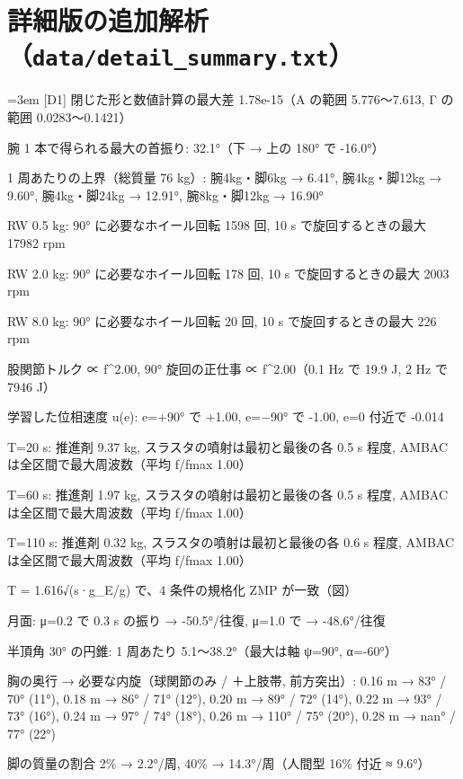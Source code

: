 \section{詳細版の追加解析（\texttt{data/detail\_summary.txt}）}
{\footnotesize\raggedright\sloppy\setlength{\parindent}{0pt}\setlength{\parskip}{0pt}\emergencystretch=3em
[D1] 閉じた形と数値計算の最大差 1.78e-15（A の範囲 5.776〜7.613, Γ の範囲 0.0283〜0.1421）\par
[D2] 腕 1 本で得られる最大の首振り: 32.1°（下 → 上の 180° で -16.0°）\par
[D3] 1 周あたりの上界（総質量 76 kg）: 腕4kg・脚6kg → 6.41°, 腕4kg・脚12kg → 9.60°, 腕4kg・脚24kg → 12.91°, 腕8kg・脚12kg → 16.90°\par
[D4] RW 0.5 kg: 90° に必要なホイール回転 1598 回, 10 s で旋回するときの最大 17982 rpm\par
[D4] RW 2.0 kg: 90° に必要なホイール回転 178 回, 10 s で旋回するときの最大 2003 rpm\par
[D4] RW 8.0 kg: 90° に必要なホイール回転 20 回, 10 s で旋回するときの最大 226 rpm\par
[D5] 股関節トルク ∝ f\^{}2.00, 90° 旋回の正仕事 ∝ f\^{}2.00（0.1 Hz で 19.9 J, 2 Hz で 7946 J）\par
[D6] 学習した位相速度 u(e): e=+90° で +1.00, e=−90° で -1.00, e=0 付近で -0.014\par
[D7] T=20 s: 推進剤 9.37 kg, スラスタの噴射は最初と最後の各 0.5 s 程度, AMBAC は全区間で最大周波数（平均 f/fmax 1.00）\par
[D7] T=60 s: 推進剤 1.97 kg, スラスタの噴射は最初と最後の各 0.5 s 程度, AMBAC は全区間で最大周波数（平均 f/fmax 1.00）\par
[D7] T=110 s: 推進剤 0.32 kg, スラスタの噴射は最初と最後の各 0.6 s 程度, AMBAC は全区間で最大周波数（平均 f/fmax 1.00）\par
[D8] T = 1.616√(s·g\_E/g) で、4 条件の規格化 ZMP が一致（図）\par
[D9] 月面: μ=0.2 で 0.3 s の振り → -50.5°/往復, μ=1.0 で → -48.6°/往復\par
[D10] 半頂角 30° の円錐: 1 周あたり 5.1〜38.2°（最大は軸 ψ=90°, α=-60°）\par
[D11] 胸の奥行 → 必要な内旋（球関節のみ / ＋上肢帯, 前方突出）: 0.16 m → 83° / 70° (11°), 0.18 m → 86° / 71° (12°), 0.20 m → 89° / 72° (14°), 0.22 m → 93° / 73° (16°), 0.24 m → 97° / 74° (18°), 0.26 m → 110° / 75° (20°), 0.28 m → nan° / 77° (22°)\par
[D12] 脚の質量の割合 2\% → 2.2°/周, 40\% → 14.3°/周（人間型 16\% 付近 ≈ 9.6°）\par
}
